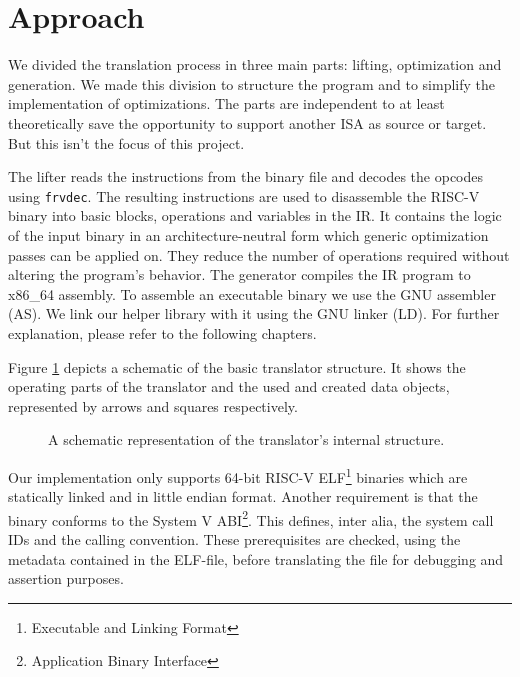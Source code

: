 \documentclass[course=eragp]{aspdoc}
\begin{document}
\section{Approach}\label{approach_section}

We divided the translation process in three main parts: lifting, optimization and generation. We
made this division to structure the program and to simplify the implementation of optimizations.
The parts are independent to at least theoretically save the opportunity to support another ISA as
source or target. But this isn't the focus of this project.

\par

The lifter reads the instructions from the binary file and decodes the opcodes using
\texttt{frvdec}\cite{frvdec}. The resulting instructions are used to disassemble the RISC-V binary into basic
blocks, operations and variables in the IR. It contains the logic of
the input binary in an architecture-neutral form which generic optimization passes can be applied
on. They reduce the number of operations required without altering the program's behavior. The
generator compiles the IR program to x86\_64 assembly. To assemble an executable binary we use the
GNU assembler (AS)\cite{gnu_binutils}. We link our helper library with it using the GNU linker
(LD)\cite{gnu_binutils}. For further explanation, please refer to the following chapters.

\par

Figure \ref{program_overview} depicts a schematic of the basic translator structure. It shows the
operating parts of the translator and the used and created data objects, represented by arrows and
squares respectively.

\begin{figure}
    \centering
    \caption{
        A schematic representation of the translator's internal structure.
    }
    \label{program_overview}
\end{figure}

\par

Our implementation only supports 64-bit RISC-V ELF\footnote{Executable and Linking Format} binaries
which are statically linked and in little endian format. Another requirement is that the binary
conforms to the System V ABI\footnote{Application Binary Interface}. This defines, inter alia, the
system call IDs and the calling convention. These prerequisites are checked, using the metadata
contained in the ELF-file, before translating the file for debugging and assertion purposes.
\end{document}
